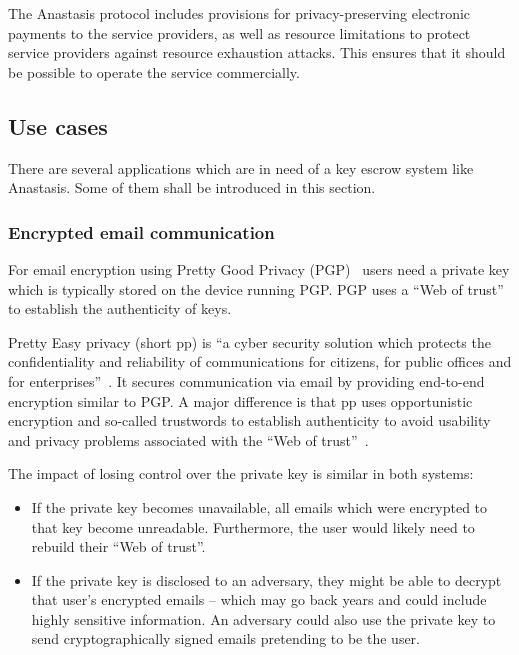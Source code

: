 The Anastasis protocol includes provisions for privacy-preserving
electronic payments to the service providers, as well as resource
limitations to protect service providers against resource exhaustion
attacks.  This ensures that it should be possible to operate the
service commercially.


\subsection{Use cases}

There are several applications which are in need of a key escrow
system like Anastasis. Some of them shall be introduced in this
section.

\subsubsection{Encrypted email communication}

For email encryption using Pretty Good Privacy
(PGP)~\cite{garfinkel1995} users need a private key which is typically
stored on the device running PGP.  PGP uses a ``Web of trust'' to
establish the authenticity of keys.

Pretty Easy privacy (short p\equiv p) is ``a cyber security solution
which protects the confidentiality and reliability of communications
for citizens, for public offices and for
enterprises''~\cite{pepdoc}. It secures communication via email by
providing end-to-end encryption similar to PGP.  A major difference is
that p\equiv p uses opportunistic encryption and so-called trustwords
to establish authenticity to avoid usability and privacy problems
associated with the ``Web of trust''~\cite{caronni2000}.

The impact of losing control over the private key is similar in both
systems:

\begin{itemize}
  \item If the private key becomes unavailable, all emails which were
encrypted to that key become unreadable. Furthermore, the user would
likely need to rebuild their ``Web of trust''.
  \item If the private key is
disclosed to an adversary, they might be able to decrypt that user's
encrypted emails -- which may go back years and could include highly
sensitive information.  An adversary could also use the private key
to send cryptographically signed emails pretending to be the user.
\end{itemize}


